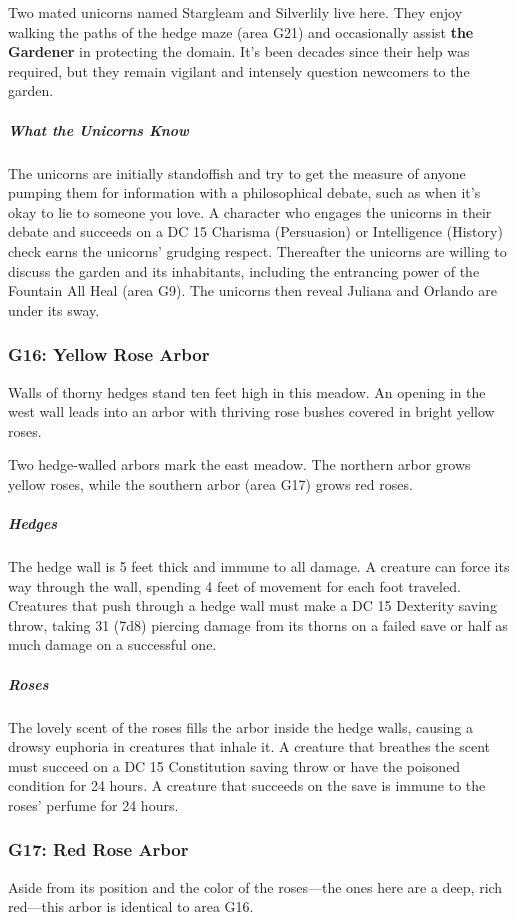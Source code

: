 \documentclass[10pt,a4paper,twoside,bg=print,twocolumn,openany,nodeprecatedcode]{dndbook}
\begin{document}
Two mated unicorns named Stargleam and Silverlily live here. They enjoy walking the paths of the hedge maze (area G21) and occasionally assist \textbf{the Gardener} in protecting the domain. It's been decades since their help was required, but they remain vigilant and intensely question newcomers to the garden.

\subparagraph{What the Unicorns Know}
The unicorns are initially standoffish and try to get the measure of anyone pumping them for information with a philosophical debate, such as when it's okay to lie to someone you love. A character who engages the unicorns in their debate and succeeds on a DC 15 Charisma (Persuasion) or Intelligence (History) check earns the unicorns' grudging respect. Thereafter the unicorns are willing to discuss the garden and its inhabitants, including the entrancing power of the Fountain All Heal (area G9). The unicorns then reveal Juliana and Orlando are under its sway.

\subsubsection{G16: Yellow Rose Arbor}
\begin{DndReadAloud}{}
Walls of thorny hedges stand ten feet high in this meadow. An opening in the west wall leads into an arbor with thriving rose bushes covered in bright yellow roses.

\end{DndReadAloud}

Two hedge-walled arbors mark the east meadow. The northern arbor grows yellow roses, while the southern arbor (area G17) grows red roses.

\subparagraph{Hedges}
The hedge wall is 5 feet thick and immune to all damage. A creature can force its way through the wall, spending 4 feet of movement for each foot traveled. Creatures that push through a hedge wall must make a DC 15 Dexterity saving throw, taking 31 (7d8) piercing damage from its thorns on a failed save or half as much damage on a successful one.

\subparagraph{Roses}
The lovely scent of the roses fills the arbor inside the hedge walls, causing a drowsy euphoria in creatures that inhale it. A creature that breathes the scent must succeed on a DC 15 Constitution saving throw or have the poisoned condition for 24 hours. A creature that succeeds on the save is immune to the roses' perfume for 24 hours.

\subsubsection{G17: Red Rose Arbor}
Aside from its position and the color of the roses—the ones here are a deep, rich red—this arbor is identical to area G16.
\end{document}
